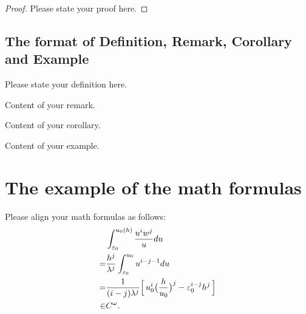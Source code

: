 \documentclass{swufeMath}
\begin{document}

\begin{proof}
Please state your proof here.
\end{proof}


\subsection{The format of Definition, Remark,  Corollary and Example}
\begin{definition}\label{de1} Please state your definition here.\end{definition}

\begin{remark}\label{re1} Content of your remark.\end{remark}

\begin{corollary}\label{co1}Content of your corollary.\end{corollary}

\begin{example}\label{ex1}Content of your example.\end{example}





\section{The example of the math formulas}
Please align your math formulas as follows:
\begin{align*}
&\int_{\varepsilon_{0}}^{u_{0}(h)}\frac{u^{i}w^{j}}{u}du\\
=&\frac{h^{j}}{\lambda^{j}}\int_{\varepsilon_{0}}^{u_{0}}u^{i-j-1}du\vspace{.2cm}\\
=&\frac{1}{(i-j)\lambda^{j}}\Big[\,u_{0}^{i}\big(\frac{h}{u_{0}}\big)^{j}-\varepsilon_{0}^{i-j}h^{j}\,\Big] \vspace{.2cm}\\
\in& C^{\omega}.
\end{align*}

\end{document}
